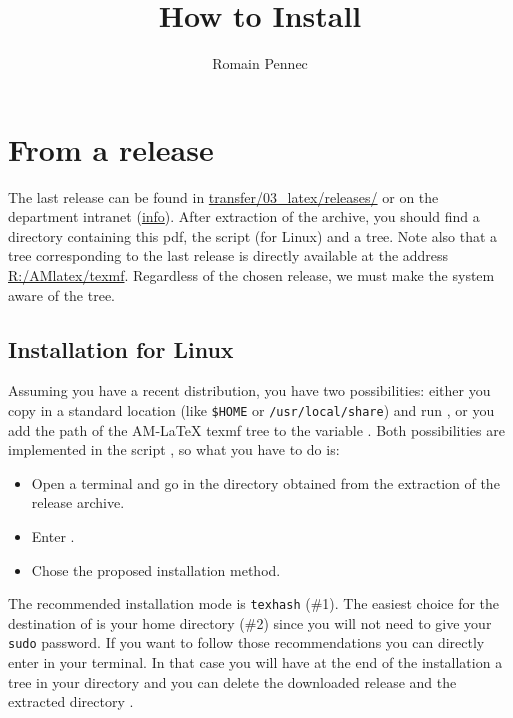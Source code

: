 \documentclass[12pt]{AMdocumentation}
\author{Romain Pennec}
\title{How to Install \AMlatex}
\providecommand{\AMlatex}{AM-\LaTeX{}\xspace}
\renewcommand{\maketitle}{\OLDmaketitle}
\begin{document}
\maketitle

\vspace{1cm}
\tableofcontents

\section{From a release}
\label{sec:release}

The last release can be found in \url{transfer/03_latex/releases/} or on the department intranet (\url{info}).  After extraction of the archive, you should find a directory containing this pdf, the script   (for Linux) and a  tree. Note also that a  tree corresponding to the last release is directly available at the address \url{R:/AMlatex/texmf}. Regardless of the chosen release, we must make the system aware of the  tree.

\subsection{Installation for Linux}
\label{sec:release:linux}

Assuming you have a recent \texlive distribution, you have two possibilities: either you copy 
 in a standard location (like \verb|$HOME| or \verb|/usr/local/share|) and run 
, or you add the path of the \AMlatex texmf tree to the variable .
Both possibilities are implemented in the script , so what you have to do is:

\begin{itemize}
\item Open a terminal and go in the directory  obtained from the extraction of the release archive.
\item Enter .
\item Chose the proposed installation method.
\end{itemize}

The recommended installation mode is \verb|texhash| (\#1). The easiest choice for the destination of  is your
home directory (\#2) since you will not need to give your \verb|sudo| password. If you want to follow those recommendations you can directly enter  in your terminal. In that case you will have at the end of the installation a  tree in your  directory and you can delete the downloaded release and the extracted directory . 
\end{document}
